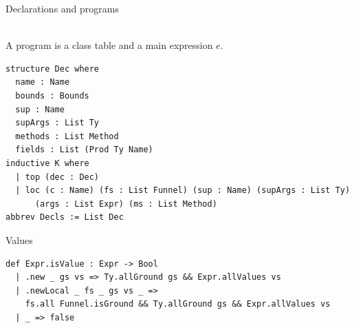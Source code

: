 \begin{cmp}{Declarations and programs}
\begin{paperside}
\\[1ex]
A program is a class table \decls and a main expression $e$.
\end{paperside}
\begin{leanside}
\begin{lstlisting}[style=leanside]
structure Dec where
  name : Name
  bounds : Bounds
  sup : Name
  supArgs : List Ty
  methods : List Method
  fields : List (Prod Ty Name)
inductive K where
  | top (dec : Dec)
  | loc (c : Name) (fs : List Funnel) (sup : Name) (supArgs : List Ty)
      (args : List Expr) (ms : List Method)
abbrev Decls := List Dec
\end{lstlisting}
\end{leanside}
\end{cmp}

\begin{cmp}{Values}
\begin{paperside}
\end{paperside}
\begin{leanside}
\begin{lstlisting}[style=leanside]
def Expr.isValue : Expr -> Bool
  | .new _ gs vs => Ty.allGround gs && Expr.allValues vs
  | .newLocal _ fs _ gs vs _ =>
    fs.all Funnel.isGround && Ty.allGround gs && Expr.allValues vs
  | _ => false
\end{lstlisting}
\end{leanside}
\end{cmp}

